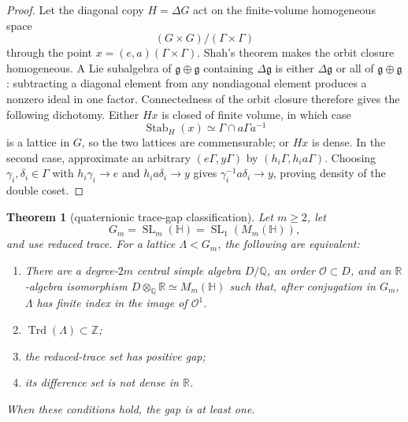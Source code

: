 \documentclass[11pt,reqno]{amsart}
\newtheorem{theorem}{Theorem}[section]
\theoremstyle{definition}
\theoremstyle{remark}
\newcommand{\R}{\mathbb R}
\newcommand{\Q}{\mathbb Q}
\newcommand{\Z}{\mathbb Z}
\newcommand{\cO}{\mathcal O}
\newcommand{\Trd}{\operatorname{Trd}}
\newcommand{\SL}{\operatorname{SL}}
\begin{document}
\begin{proof}
Let the diagonal copy \(H=\Delta G\) act on the finite-volume homogeneous
space
\[
 (G\times G)/(\Gamma\times\Gamma)
\]
through the point \(x=(e,a)(\Gamma\times\Gamma)\).  Shah's theorem makes the
orbit closure homogeneous.  A Lie subalgebra of
\(\mathfrak g\oplus\mathfrak g\) containing \(\Delta\mathfrak g\) is either
\(\Delta\mathfrak g\) or all of \(\mathfrak g\oplus\mathfrak g\): subtracting
a diagonal element from any nondiagonal element produces a nonzero ideal in
one factor.  Connectedness of the orbit closure therefore gives the following
dichotomy.  Either \(Hx\) is closed of finite volume, in which case
\[
 \operatorname{Stab}_H(x)\simeq\Gamma\cap a\Gamma a^{-1}
\]
is a lattice in \(G\), so the two lattices are commensurable; or \(Hx\) is
dense.  In the second case, approximate an arbitrary
\((e\Gamma,y\Gamma)\) by \((h_i\Gamma,h_i a\Gamma)\).  Choosing
\(\gamma_i,\delta_i\in\Gamma\) with \(h_i\gamma_i\to e\) and
\(h_i a\delta_i\to y\) gives
\(\gamma_i^{-1}a\delta_i\to y\), proving density of the double coset.
\end{proof}

\begin{theorem}[quaternionic trace-gap classification]\label{thm:quaternionic}
Let \(m\ge2\), let
\[
 G_m=\SL_m(\mathbb H)=\SL_1(M_m(\mathbb H)),
\]
and use reduced trace.  For a lattice \(\Lambda<G_m\), the following are
equivalent:
\begin{enumerate}[label=\textup{(\arabic*)}]
\item There are a degree-\(2m\) central simple algebra \(D/\Q\), an order
\(\cO\subset D\), and an \(\R\)-algebra isomorphism
\(D\otimes_\Q\R\simeq M_m(\mathbb H)\) such that, after conjugation in
\(G_m\), \(\Lambda\) has finite index in the image of \(\cO^1\).
\item \(\Trd(\Lambda)\subset\Z\);
\item the reduced-trace set has positive gap;
\item its difference set is not dense in \(\R\).
\end{enumerate}
When these conditions hold, the gap is at least one.
\end{theorem}
\end{document}
